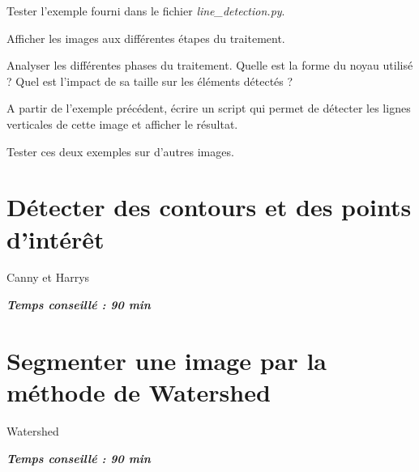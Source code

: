 \documentclass[a4paper,11pt,titlepage]{article} %
\begin{document}
\Manip Tester l'exemple fourni dans le fichier \textsl{line\_detection.py}.

\Manip Afficher les images aux différentes étapes du traitement.

\Quest Analyser les différentes phases du traitement. Quelle est la forme du noyau utilisé ? Quel est l'impact de sa taille sur les éléments détectés ?

\Manip A partir de l'exemple précédent, écrire un script qui permet de détecter les lignes verticales de cette image et afficher le résultat.

\Manip Tester ces deux exemples sur d'autres images.




\section{Détecter des contours et des points d'intérêt}

Canny et Harrys

\begin{center} \textbf{\textit{Temps conseillé : 90 min}} \end{center}



\section{Segmenter une image par la méthode de Watershed}

Watershed

\begin{center} \textbf{\textit{Temps conseillé : 90 min}} \end{center}

\end{document}
